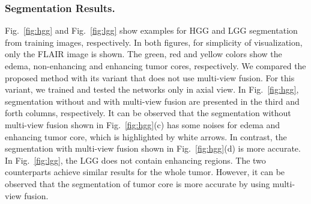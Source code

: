 \documentclass[a4paper,orivec,runningheads]{llncs}
\begin{document}
\subsubsection{Segmentation Results.} 
Fig.~\ref{fig:hgg} and Fig.~\ref{fig:lgg} show examples for HGG and LGG segmentation from training images, respectively. In both figures, for simplicity of visualization, only the FLAIR image is shown. The green, red and yellow colors show the edema, non-enhancing and enhancing tumor cores, respectively. We compared the proposed method with its variant that does not use multi-view fusion. For this variant, we trained and tested the networks only in axial view. In Fig.~\ref{fig:hgg}, segmentation without and with multi-view fusion are presented in the third and forth columns, respectively.  It can be observed that the segmentation without multi-view fusion shown in Fig.~\ref{fig:hgg}(c) has some noises for edema and enhancing tumor core, which is highlighted by white arrows. In contrast, the segmentation with multi-view fusion shown in Fig.~\ref{fig:hgg}(d) is more accurate. In Fig.~\ref{fig:lgg}, the LGG does not contain enhancing regions. The two counterparts achieve similar results for the whole tumor. However, it can be observed that the segmentation of tumor core is more accurate by using multi-view fusion.
\end{document}
